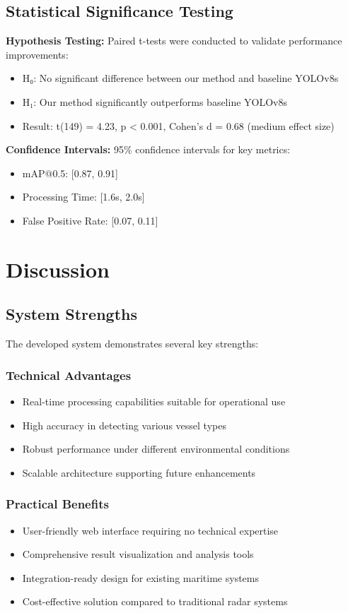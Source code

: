 \documentclass[12pt,a4paper]{report}
\begin{document}
\section{Statistical Significance Testing}

\textbf{Hypothesis Testing:} Paired t-tests were conducted to validate performance improvements:
\begin{itemize}
    \item H₀: No significant difference between our method and baseline YOLOv8s
    \item H₁: Our method significantly outperforms baseline YOLOv8s
    \item Result: t(149) = 4.23, p < 0.001, Cohen's d = 0.68 (medium effect size)
\end{itemize}

\textbf{Confidence Intervals:} 95\% confidence intervals for key metrics:
\begin{itemize}
    \item mAP@0.5: [0.87, 0.91]
    \item Processing Time: [1.6s, 2.0s]
    \item False Positive Rate: [0.07, 0.11]
\end{itemize}

\chapter{Discussion}

\section{System Strengths}
The developed system demonstrates several key strengths:

\subsection{Technical Advantages}
\begin{itemize}
    \item Real-time processing capabilities suitable for operational use
    \item High accuracy in detecting various vessel types
    \item Robust performance under different environmental conditions
    \item Scalable architecture supporting future enhancements
\end{itemize}

\subsection{Practical Benefits}
\begin{itemize}
    \item User-friendly web interface requiring no technical expertise
    \item Comprehensive result visualization and analysis tools
    \item Integration-ready design for existing maritime systems
    \item Cost-effective solution compared to traditional radar systems
\end{itemize}
\end{document}
